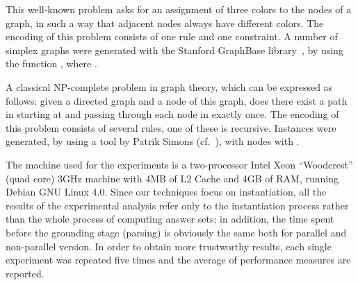 \documentclass[preprint]{tlp}
\newcommand{\NP}{{\rm NP}\xspace}
\begin{document}
 This well-known problem asks for an assignment of
three colors to the nodes of a graph, in such a way that adjacent
nodes always have different colors. The encoding of this problem
consists of one rule and one constraint. A number of simplex graphs were
generated with the Stanford GraphBase library~\cite{knut-94}, by
using the function  , where .

A classical \NP-complete problem in graph theory, which can be
expressed as follows: given a directed graph  and a node  of this graph, does there exist a path in  starting at 
and passing through each node in  exactly once. The encoding of
this problem consists of several rules, one of these is recursive.
Instances were generated, by  using a tool by Patrik Simons
(cf.~\cite{simo-2000}), with  nodes  with .

The machine used for the experiments is a two-processor Intel Xeon
``Woodcrest'' (quad core) 3GHz machine with 4MB of L2 Cache and 4GB
of RAM,
running Debian GNU Linux 4.0.
Since our techniques focus on instantiation, all the results of the
experimental analysis refer only to the instantiation process
rather than the whole process of computing answer sets;
in addition, the time spent before the
grounding stage (parsing) is obviously the same both for parallel and
non-parallel version. In order to obtain more trustworthy results,
each single experiment was repeated five times and
the average of performance measures are reported.
\end{document}
